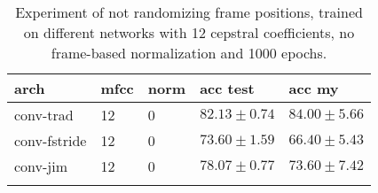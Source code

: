 \begin{table}[ht!]
\small
\begin{center}
\caption{Experiment of not randomizing frame positions, trained on different networks with 12 cepstral coefficients, no frame-based normalization and 1000 epochs.}
\begin{tabular}{ M{3cm}  M{2cm}  M{2cm}  M{2.5cm}  M{2.5cm} }
\toprule
\textbf{arch} & \textbf{mfcc} & \textbf{norm} & \textbf{acc test} & \textbf{acc my} \\
\midrule
conv-trad & 12 & 0 & $82.13 \pm 0.74$ & $84.00 \pm 5.66$ \\
conv-fstride &12 & 0 & $73.60 \pm 1.59$ & $66.40 \pm 5.43$ \\
conv-jim & 12 & 0 & $78.07 \pm 0.77$ & $73.60 \pm 7.42$ \\
\bottomrule
\label{tab:exp_fs_rand_frames_l12}
\end{tabular}
\end{center}
\vspace{-4mm}
\end{table}
\FloatBarrier
\noindent